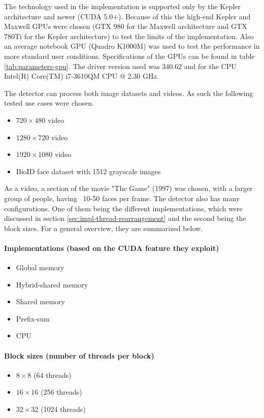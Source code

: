 The technology used in the implementation is supported only by the Kepler architecture and newer (CUDA 5.0+). Because of this the high-end Kepler and Maxwell GPUs were chosen (GTX 980 for the Maxwell architecture and GTX 780Ti for the Kepler architecture) to test the limits of the implementation. Also an average notebook GPU (Quadro K1000M) was used to test the performance in more standard user conditions. Specifications of the GPUs can be found in table \ref{tab:parameters-gpu}. The driver version used was 340.62 and for the CPU Intel(R) Core(TM) i7-3610QM CPU @ 2.30 GHz.

The detector can process both image datasets and videos. As such the following tested use cases were chosen.

\begin{itemize}
	\item $720 \times 480$ video
	\item $1280 \times 720$ video
	\item $1920 \times 1080$ video
	\item BioID face dataset with 1512 grayscale images
\end{itemize}

As a video, a section of the movie "The Game" (1997) was chosen, with a larger group of people, having ~10-50 faces per frame. The detector also has many configurations. One of them being the different implementations, which were discussed in section \ref{sec:impl-thread-rearrangement} and the second being the block sizes. For a general overview, they are summarized below.

\paragraph{Implementations (based on the CUDA feature they exploit)}
\begin{itemize}
	\item Global memory
	\item Hybrid-shared memory
	\item Shared memory
	\item Prefix-sum
	\item CPU
\end{itemize}

\paragraph{Block sizes (number of threads per block)}
\begin{itemize}
	\item $8 \times 8$ (64 threads)
	\item $16 \times 16$ (256 threads)
	\item $32 \times 32$ (1024 threads)
\end{itemize}

